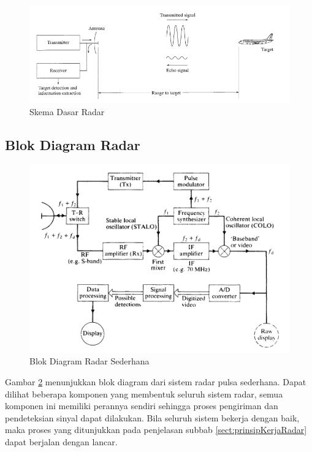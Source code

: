  \begin{figure}
	\begin{center}
		\includegraphics[scale=0.5]{pics/bab2/skemaradar.png} 
		\caption[Skema Dasar Radar]{{Skema Dasar Radar} \cite{Skolnik2001}}
		\label{pic:skemaRadar}
	\end{center}
\end{figure}

\subsection{Blok Diagram Radar}
 \begin{figure}
	\begin{center}
		\includegraphics[scale=0.4]{pics/bab2/blokdiagram.png} 
		\caption[Blok Diagram Radar]{{Blok Diagram Radar Sederhana \cite{Kingsley1999}}}
		\label{pic:blokdiagram}
	\end{center}
\end{figure}
Gambar \ref{pic:blokdiagram} menunjukkan blok diagram dari sistem radar pulsa sederhana. Dapat dilihat beberapa komponen yang membentuk seluruh sistem radar, semua komponen ini memiliki perannya sendiri sehingga proses pengiriman dan pendeteksian sinyal dapat dilakukan.  Bila seluruh sistem bekerja dengan baik, maka proses yang ditunjukkan pada penjelasan subbab \ref{sect:prinsipKerjaRadar} dapat berjalan dengan lancar.


